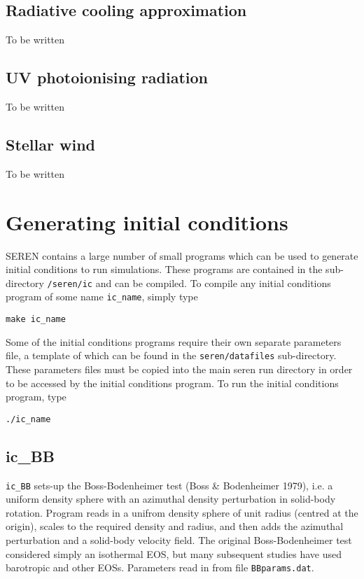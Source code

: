 \documentclass[a4paper]{article}
\newcommand{\var}[1]{\texttt{#1}}
\begin{document}
\subsection{Radiative cooling approximation}
To be written


\subsection{UV photoionising radiation}
To be written


\subsection{Stellar wind}
To be written




\newpage

\section{Generating initial conditions} \label{SS:ICS}
SEREN contains a large number of small programs which can be used to generate initial conditions to run simulations.  These programs are contained in the sub-directory \var{/seren/ic} and can be compiled.  To compile any initial conditions program of some name \var{ic\_name}, simply type \newline 

\var{make ic\_name} \newline

\noindent Some of the initial conditions programs require their own separate parameters file, a template of which can be found in the \var{seren/datafiles} sub-directory.  These parameters files must be copied into the main seren run directory in order to be accessed by the initial conditions program.  To run the initial conditions program, type \newline

\var{./ic\_name}


\subsection{ic\_BB}
\var{ic\_BB} sets-up the Boss-Bodenheimer test (Boss \& Bodenheimer 1979), i.e. a uniform density sphere with an azimuthal density perturbation in solid-body rotation.  Program reads in a unifrom density sphere of unit radius (centred at the origin), scales to the required density and radius, and then adds the azimuthal perturbation and a solid-body velocity field.  The original Boss-Bodenheimer test considered simply an isothermal EOS, but many subsequent studies have used barotropic and other EOSs.  Parameters read in from file \var{BBparams.dat}. \newline
\end{document}
